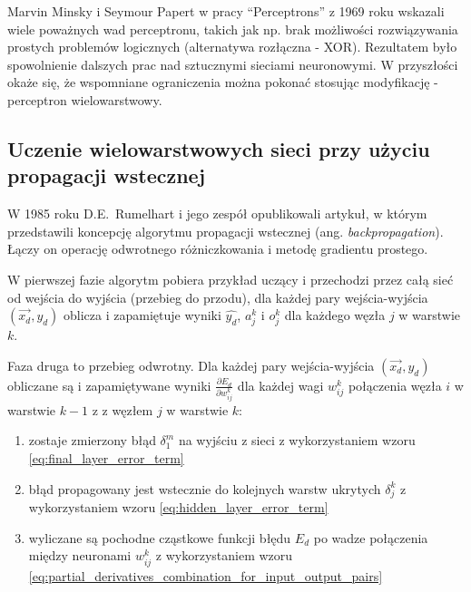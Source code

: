 \documentclass[a4paper,12pt]{article}
\numberwithin{figure}{section}
\begin{document}
    \bigskip

    Marvin Minsky i Seymour Papert w pracy ``Perceptrons'' z 1969 roku wskazali wiele poważnych wad perceptronu, takich jak np. brak możliwości rozwiązywania prostych problemów logicznych (alternatywa rozłączna - XOR). Rezultatem było spowolnienie dalszych prac nad sztucznymi sieciami neuronowymi. W przyszłości okaże się, że wspomniane ograniczenia można pokonać stosując modyfikację - perceptron wielowarstwowy\cite{UczenieMaszynowe2018}.

    \subsection{Uczenie wielowarstwowych sieci przy użyciu propagacji wstecznej}

    W 1985 roku D.E.\ Rumelhart i jego zespół opublikowali artykuł\cite{Backpropagation1985}, w którym przedstawili koncepcję algorytmu propagacji wstecznej (ang. \textit{backpropagation}).
    Łączy on operację odwrotnego różniczkowania i metodę gradientu prostego.

    \bigskip

    W pierwszej fazie algorytm pobiera przykład uczący i przechodzi przez całą sieć od wejścia do wyjścia (przebieg do przodu), dla każdej pary wejścia-wyjścia $(\vec{x_d}, y_d)$ oblicza i zapamiętuje wyniki $\widehat{y_d}$, $a_j^k$ i $o_j^k$ dla każdego węzła $j$ w warstwie $k$.

    \bigskip

    Faza druga to przebieg odwrotny. Dla każdej pary wejścia-wyjścia $(\vec{x_d}, y_d)$ obliczane są i zapamiętywane wyniki $\frac{\partial E_d}{\partial w_{ij}^k}$ dla każdej wagi $w_{ij}^k$ połączenia węzła $i$ w warstwie $k-1$ z z węzłem $j$ w warstwie $k$:
    \begin{enumerate}
        \item zostaje zmierzony błąd $\delta_1^m$ na wyjściu z sieci z wykorzystaniem wzoru \ref{eq:final_layer_error_term}
        \item błąd propagowany jest wstecznie do kolejnych warstw ukrytych $\delta_j^k$ z wykorzystaniem wzoru \ref{eq:hidden_layer_error_term}
        \item wyliczane są pochodne cząstkowe funkcji błędu $E_d$ po wadze połączenia między neuronami $w_{ij}^k$ z wykorzystaniem wzoru \ref{eq:partial_derivatives_combination_for_input_output_pairs}
    \end{enumerate}

    \bigskip
\end{document}
